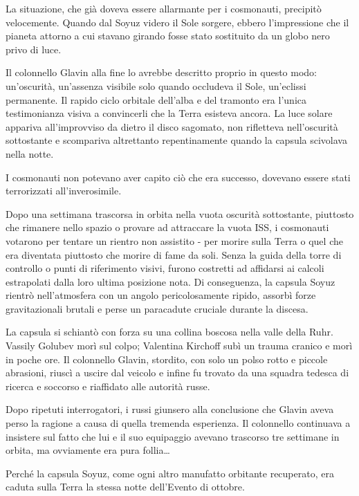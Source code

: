 La situazione, che già doveva essere allarmante per i cosmonauti,
precipitò velocemente. Quando dal Soyuz videro il Sole sorgere, ebbero
l'impressione che il pianeta attorno a cui stavano girando fosse stato
sostituito da un globo nero privo di luce.

Il colonnello Glavin alla fine lo avrebbe descritto proprio in questo
modo: un'oscurità, un'assenza visibile solo quando occludeva il Sole,
un'eclissi permanente. Il rapido ciclo orbitale dell'alba e del tramonto
era l'unica testimonianza visiva a convincerli che la Terra esisteva
ancora. La luce solare appariva all'improvviso da dietro il disco
sagomato, non rifletteva nell'oscurità sottostante e scompariva
altrettanto repentinamente quando la capsula scivolava nella notte.

I cosmonauti non potevano aver capito ciò che era successo, dovevano
essere stati terrorizzati all'inverosimile.

Dopo una settimana trascorsa in orbita nella vuota oscurità sottostante,
piuttosto che rimanere nello spazio o provare ad attraccare la vuota
ISS, i cosmonauti votarono per tentare un rientro non assistito - per
morire sulla Terra o quel che era diventata piuttosto che morire di fame
da soli. Senza la guida della torre di controllo o punti di riferimento
visivi, furono costretti ad affidarsi ai calcoli estrapolati dalla loro
ultima posizione nota. Di conseguenza, la capsula Soyuz rientrò
nell'atmosfera con un angolo pericolosamente ripido, assorbì forze
gravitazionali brutali e perse un paracadute cruciale durante la
discesa.

La capsula si schiantò con forza su una collina boscosa nella valle
della Ruhr. Vassily Golubev morì sul colpo; Valentina Kirchoff subì un
trauma cranico e morì in poche ore. Il colonnello Glavin, stordito, con
solo un polso rotto e piccole abrasioni, riuscì a uscire dal veicolo e
infine fu trovato da una squadra tedesca di ricerca e soccorso e
riaffidato alle autorità russe.

Dopo ripetuti interrogatori, i russi giunsero alla conclusione che
Glavin aveva perso la ragione a causa di quella tremenda esperienza. Il
colonnello continuava a insistere sul fatto che lui e il suo equipaggio
avevano trascorso tre settimane in orbita, ma ovviamente era pura
follia\ldots{}

Perché la capsula Soyuz, come ogni altro manufatto orbitante recuperato,
era caduta sulla Terra la stessa notte dell'Evento di ottobre.

\separatorefiori

